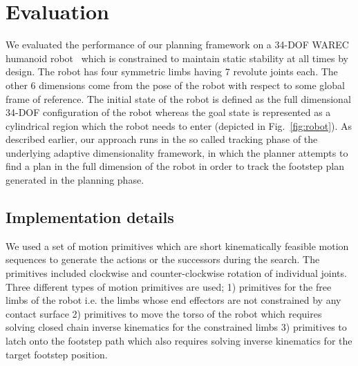 \documentclass[conference]{IEEEtran}
\begin{document}
\section{Evaluation }
\label{sec:eval}

We evaluated the performance of our planning framework on a 34-DOF WAREC humanoid robot~\cite{MHSetal15} 
which is constrained to maintain static stability at all times by design. The robot has four symmetric limbs having 7 revolute joints each. The other 6 dimensions come from the pose of the robot with respect to some global frame of reference. The initial state of the robot is defined as the full dimensional 34-DOF configuration of the robot whereas the goal state is represented as a cylindrical region which the robot needs to enter (depicted in Fig.~\ref{fig:robot}). As described earlier, our approach runs in the so called tracking phase of the underlying adaptive dimensionality framework, in which the planner attempts to find a plan in the full dimension of the robot in order to track the footstep plan generated in the planning phase. 

\subsection{Implementation details}
We used a set of motion primitives which are short kinematically feasible motion sequences to generate the actions or the successors during the search. The primitives included clockwise and counter-clockwise rotation of individual joints. Three different types of motion primitives are used; 1) primitives for the free limbs of the robot i.e. the limbs whose end effectors are not constrained by any contact surface 2) primitives to move the torso of the robot which requires solving closed chain inverse kinematics for the constrained limbs 3) primitives to latch onto the footstep path which also requires solving inverse kinematics for the target footstep position.
\end{document}
